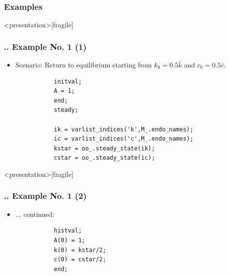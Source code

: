 \documentclass[11pt,aspectratio=169]{beamer}
\begin{document}
\subsubsection{Examples}
\begin{frame}<presentation>[fragile]
	\frametitle{{\thesection.\thesubsection.\thesubsubsection} Example No. 1 (1)}
	\begin{itemize}
		\item Scenario: Return to equilibrium starting from $k_0=0.5\bar{k}$ and $c_0=0.5\bar{c}$.
		\begin{verbatim}
		   initval;
		   A = 1;
		   end;
		   steady;
		
		   ik = varlist_indices('k',M_.endo_names);
		   ic = varlist_indices('c',M_.endo_names);
		   kstar = oo_.steady_state(ik);
		   cstar = oo_.steady_state(ic);
		\end{verbatim}
	\end{itemize}
\end{frame}
\begin{frame}<presentation>[fragile]
	\frametitle{{\thesection.\thesubsection.\thesubsubsection} Example No. 1 (2)}
	\begin{itemize}
		\item ... continued:
		\begin{verbatim}
		   histval;
		   A(0) = 1;
		   k(0) = kstar/2;
		   c(0) = cstar/2;
		   end;
		\end{verbatim}
	\end{itemize}
\end{frame}
\end{document}
